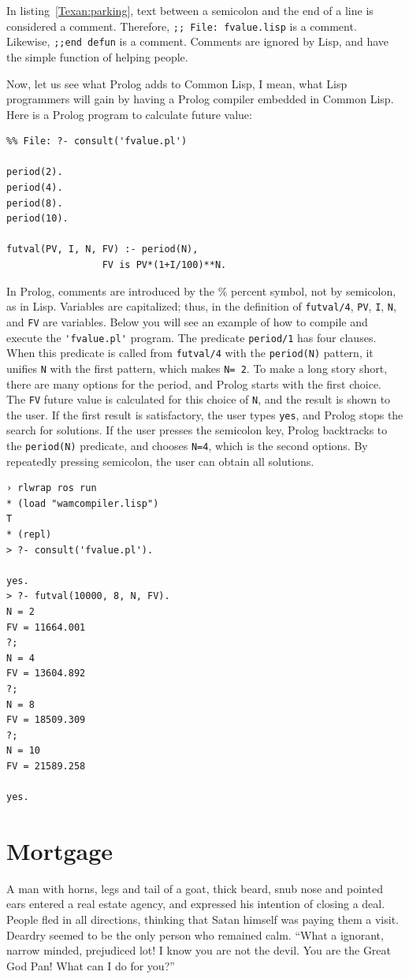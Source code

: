 \documentclass[a4paper,12pt]{book}
\begin{document}
In listing~\ref{Texan:parking}, text
between a semicolon and the end of
a line is considered a comment.
Therefore, \verb|;; File: fvalue.lisp|
is a comment. Likewise, \verb|;;end defun|
is a comment. Comments are ignored by
Lisp, and have the simple function of
helping people.

Now, let us see what Prolog adds to Common Lisp,
I mean, what Lisp programmers will gain by
having a Prolog compiler embedded in Common
Lisp. Here is a Prolog program to calculate
future value:
\begin{verbatim}
%% File: ?- consult('fvalue.pl')

period(2).
period(4).
period(8).
period(10).

futval(PV, I, N, FV) :- period(N),
                 FV is PV*(1+I/100)**N.
\end{verbatim}

In Prolog, comments are introduced by the \%
percent symbol, not by semicolon, as in Lisp.
Variables are capitalized; thus, in the definition
of \verb|futval/4|, \verb|PV|, \verb|I|, \verb|N|,
and \verb|FV| are variables. Below you will
see an example of how to compile and execute
the \verb|'fvalue.pl'| program. The predicate
\verb|period/1| has four clauses. When this predicate
is called from \verb|futval/4| with the 
\verb|period(N)| pattern, it unifies \verb|N|
with the first pattern, which makes \verb|N= 2|.
To make a long story short, there are many
options for the period, and Prolog starts with
the first choice. The \verb|FV| future value
is calculated for this choice of \verb|N|,
and the result is shown to the user. If the
first result is satisfactory, the user types
\verb|yes|, and Prolog stops the search for
solutions. If the user presses the semicolon
key, Prolog backtracks to the \verb|period(N)|
predicate, and chooses \verb|N=4|, which is
the second options. By repeatedly pressing
semicolon, the user can obtain all solutions.

\begin{verbatim}
› rlwrap ros run
* (load "wamcompiler.lisp")
T
* (repl)
> ?- consult('fvalue.pl').

yes.
> ?- futval(10000, 8, N, FV).
N = 2
FV = 11664.001
?;
N = 4
FV = 13604.892
?;
N = 8
FV = 18509.309
?;
N = 10
FV = 21589.258

yes.
\end{verbatim}

\section{Mortgage}
A man with horns, legs and tail of a goat,
thick beard, snub nose and pointed ears entered
a real estate agency, and expressed his intention
of closing a deal. People fled in all directions,
thinking that Satan himself was paying them a visit.
Deardry seemed to be the only person who remained
calm. “What a ignorant, narrow minded, prejudiced
lot! I know you are not the devil. You are the
Great God Pan! What can I do for you?”
\end{document}
